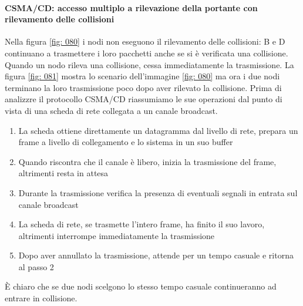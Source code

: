 \documentclass[11pt,a4paper]{article}
\begin{document}
\paragraph{CSMA/CD: accesso multiplo a rilevazione della portante con rilevamento delle collisioni} \label{par: CSMA/CD}
Nella figura \ref{fig: 080} i nodi non eseguono il rilevamento delle collisioni: B e D continuano a trasmettere i loro pacchetti anche se si è verificata una collisione. Quando un nodo rileva una collisione, cessa immediatamente la trasmissione. La figura \ref{fig: 081} mostra lo scenario dell'immagine \ref{fig: 080} ma ora i due nodi terminano la loro trasmissione poco dopo aver rilevato la collisione. Prima di analizzre il protocollo CSMA/CD riassumiamo le sue operazioni dal punto di vista di una scheda di rete collegata a un canale broadcast.
\begin{enumerate}
	\item La scheda ottiene direttamente un datagramma dal livello di rete, prepara un frame a livello di collegamento e lo sistema in un suo buffer
	\item Quando riscontra che il canale è libero, inizia la trasmissione del frame, altrimenti resta in attesa
	\item Durante la trasmissione verifica la presenza di eventuali segnali in entrata sul canale broadcast
	\item La scheda di rete, se trasmette l'intero frame, ha finito il suo lavoro, altrimenti interrompe immediatamente la trasmissione
	\item Dopo aver annullato la trasmissione, attende per un tempo casuale e ritorna al passo 2
\end{enumerate}
È chiaro che se due nodi scelgono lo stesso tempo casuale continueranno ad entrare in collisione.
\end{document}
